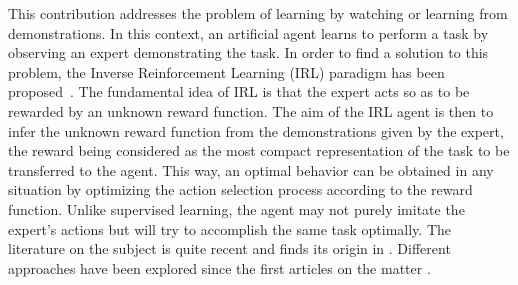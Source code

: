 \documentclass[tablecaption=bottom]{jmlr}
\begin{document}
This contribution addresses the problem of learning by watching or
learning from demonstrations. In this context, an artificial agent
learns to perform a task by observing an expert demonstrating the
task. In order to find a solution to this problem, the Inverse
Reinforcement Learning (IRL) paradigm has been
proposed~\cite{russell1998learning}. The fundamental idea of IRL is
that the expert acts so as to be rewarded by an unknown reward
function. The aim of the IRL agent is then to infer the unknown
reward function from the demonstrations given by the expert, the
reward being considered as the most compact representation of the
task to be transferred to the agent. This way, an optimal behavior
can be obtained in any situation by optimizing the action selection
process according to the reward function. Unlike supervised
learning, the agent may not purely imitate the expert's actions but
will try to accomplish the same task optimally.
%
%
%
%
The literature on the subject is quite recent and finds its origin
in \cite{russell1998learning}. Different approaches have been
explored since the first articles on the matter
\cite{ng2000algorithms,abbeel2004apprenticeship}.
\end{document}
